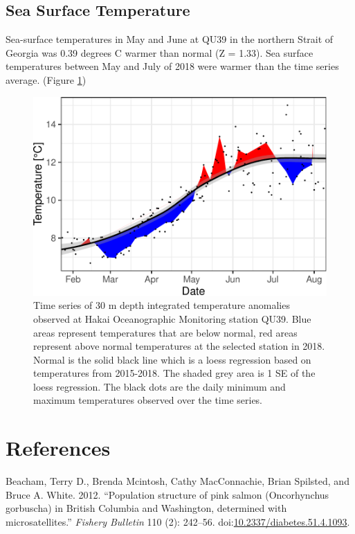 \documentclass[fleqn,10pt]{wlpeerj} %
\begin{document}
\subsection*{Sea Surface Temperature}\label{sea-surface-temperature}

Sea-surface temperatures in May and June at QU39 in the northern Strait
of Georgia was 0.39 degrees C warmer than normal (Z = 1.33). Sea surface
temperatures between May and July of 2018 were warmer than the time
series average. (Figure \ref{fig:sst})

\begin{figure}[H]
\includegraphics[width=0.8\linewidth]{peer_j_migration_dynamics_files/figure-latex/sst-1} \caption{Time series of 30 m depth integrated temperature anomalies observed at Hakai Oceanographic Monitoring station QU39. Blue areas represent temperatures that are below normal, red areas represent above normal temperatures at the selected station in 2018. Normal is the solid black line which is a loess regression based on temperatures from 2015-2018. The shaded grey area is 1 SE of the loess regression. The black dots are the daily minimum and maximum temperatures observed over the time series.}\label{fig:sst}
\end{figure}

\section*{References}\label{references}

\hypertarget{refs}{}
\hypertarget{ref-Beacham2012}{}
Beacham, Terry D., Brenda Mcintosh, Cathy MacConnachie, Brian Spilsted,
and Bruce A. White. 2012. ``Population structure of pink salmon
(Oncorhynchus gorbuscha) in British Columbia and Washington, determined
with microsatellites.'' \emph{Fishery Bulletin} 110 (2): 242--56.
doi:\href{https://doi.org/10.2337/diabetes.51.4.1093}{10.2337/diabetes.51.4.1093}.
\end{document}
